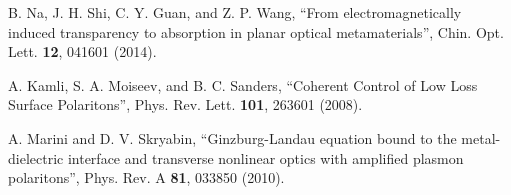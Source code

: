\documentclass[aps,pra,preprint,groupedaddress,amsmath,amssymb,showpacs]{revtex4-1}
\begin{document}
\begin{references}
\vskip 0.7cm

 B. Na, J. H. Shi, C. Y. Guan, and Z. P. Wang,
``From electromagnetically induced transparency to absorption in planar optical metamaterials'',
Chin. Opt. Lett. {\bf 12}, 041601 (2014).

\vskip 0.7cm

 A. Kamli, S. A. Moiseev, and B. C. Sanders,
``Coherent Control of Low Loss Surface Polaritons'',
Phys. Rev. Lett. {\bf 101}, 263601 (2008).

%


\vskip 0.7cm

 A. Marini and D. V. Skryabin,
``Ginzburg-Landau equation bound to the metal-dielectric interface and transverse nonlinear optics with amplified plasmon polaritons'',
Phys. Rev. A {\bf 81}, 033850 (2010).

\vskip 0.7cm

\end{references}
\end{document}
